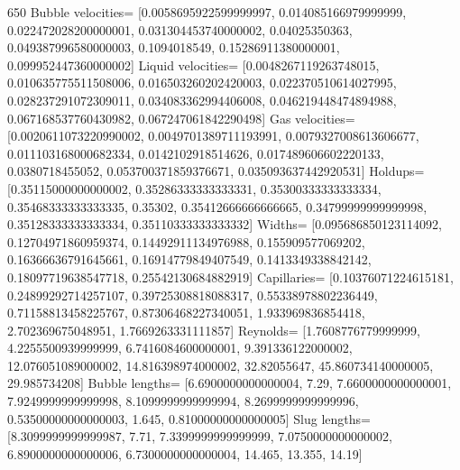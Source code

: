 \documentclass{article}
\begin{document}
650
Bubble velocities= [0.0058695922599999997, 0.014085166979999999, 0.022472028200000001,
0.031304453740000002, 0.04025350363, 0.049387996580000003, 0.1094018549, 0.15286911380000001,
0.099952447360000002]
Liquid velocities= [0.0048267119263748015, 0.010635775511508006, 0.016503260202420003,
0.022370510614027995, 0.028237291072309011, 0.034083362994406008, 0.046219448474894988,
0.067168537760430982, 0.067247061842290498]
Gas velocities= [0.0020611073220990002, 0.0049701389711193991, 0.0079327008613606677,
0.011103168000682334, 0.0142102918514626, 0.017489606602220133, 0.0380718455052,
0.053700371859376671, 0.035093637442920531]
Holdups= [0.35115000000000002, 0.35286333333333331, 0.35300333333333334, 0.35468333333333335,
0.35302, 0.35412666666666665, 0.34799999999999998, 0.35128333333333334, 0.35110333333333332]
Widths= [0.095686850123114092, 0.12704971860959374, 0.14492911134976988, 0.155909577069202,
0.16366636791645661, 0.16914779849407549, 0.1413349338842142, 0.18097719638547718,
0.25542130684882919]
Capillaries= [0.10376071224615181, 0.24899292714257107, 0.39725308818088317, 0.55338978802236449,
0.71158813458225767, 0.87306468227340051, 1.933969836854418, 2.702369675048951, 1.7669263331111857]
Reynolds= [1.7608776779999999, 4.2255500939999999, 6.7416084600000001, 9.391336122000002,
12.076051089000002, 14.816398974000002, 32.82055647, 45.860734140000005, 29.985734208]
Bubble lengths= [6.6900000000000004, 7.29, 7.6600000000000001, 7.9249999999999998,
8.1099999999999994, 8.2699999999999996, 0.53500000000000003, 1.645, 0.81000000000000005]
Slug lengths= [8.3099999999999987, 7.71, 7.3399999999999999, 7.0750000000000002, 6.8900000000000006,
6.7300000000000004, 14.465, 13.355, 14.19]
\end{document}
